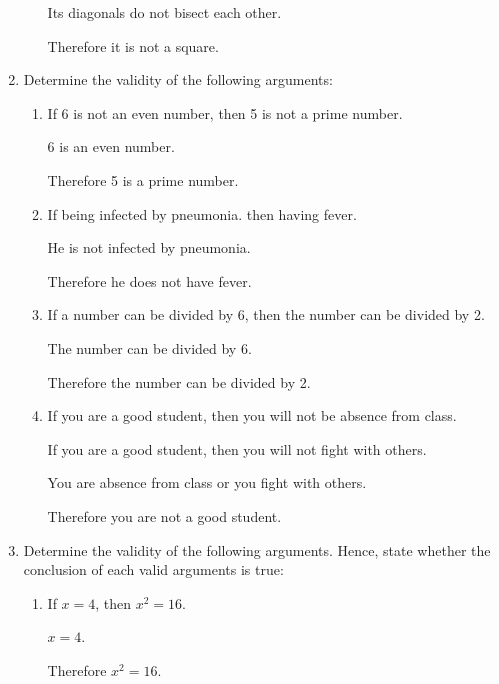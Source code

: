 \documentclass{report}
\begin{document}
\begin{enumerate}[leftmargin=*]
\begin{enumerate}[leftmargin=*]
                    Its diagonals do not bisect each other.

                    Therefore it is not a square.
          \end{enumerate}

    \item Determine the validity of the following arguments:
          \begin{enumerate}[leftmargin=*]
              \item If 6 is not an even number, then 5 is not a prime number.

                    6 is an even number.

                    Therefore 5 is a prime number.

              \item If being infected by pneumonia. then having fever.

                    He is not infected by pneumonia.

                    Therefore he does not have fever.

              \item If a number can be divided by 6, then the number can be divided by 2.

                    The number can be divided by 6.

                    Therefore the number can be divided by 2.

              \item If you are a good student, then you will not be absence from class.

                    If you are a good student, then you will not fight with others.

                    You are absence from class or you fight with others.

                    Therefore you are not a good student.
          \end{enumerate}

    \item Determine the validity of the following arguments. Hence, state whether the
          conclusion of each valid arguments is true:
          \begin{enumerate}[leftmargin=*]
              \item If $x = 4$, then $x^2 = 16$.

                    $x = 4$.

                    Therefore $x^2 = 16$.


\end{enumerate}
\end{enumerate}
\end{document}
